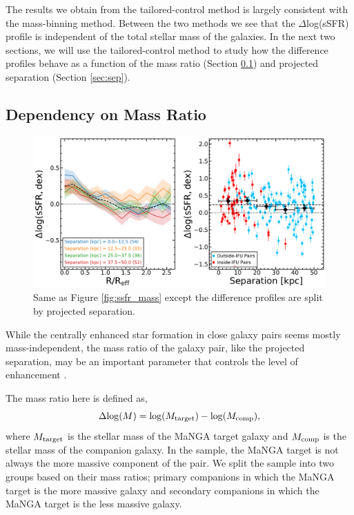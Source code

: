 \documentclass[iop,revtex4,twocolumn,apj,numberedappendix,appendixfloats]{emulateapj}
\begin{document}
The results we obtain from the tailored-control method is largely consistent with the mass-binning method. Between the two methods we see that the $\Delta$log(sSFR) profile is independent of the total stellar mass of the galaxies. In the next two sections, we will use the tailored-control method to study how the difference profiles behave as a function of the mass ratio (Section \ref{sec:dm}) and projected separation (Section \ref{sec:sep}).

\subsection{Dependency on Mass Ratio}\label{sec:dm}

\begin{figure}
\centering
\includegraphics[width=0.8\linewidth]{fig/ssfr_sep.pdf}
\caption[]{Same as Figure \ref{fig:ssfr_mass} except the difference profiles are split by projected separation. }
\label{fig:ssfr_sep}
\end{figure}

While the centrally enhanced star formation in close galaxy pairs seems mostly mass-independent, the mass ratio of the galaxy pair, like the projected separation, may be an important parameter that controls the level of enhancement \citep{Ellison:2008}. 

The mass ratio here is defined as, 
\begin{equation}
\Delta {\rm log}(M) = {\rm log}(M_{\rm target}) - {\rm log}(M_{\rm comp}),
\end{equation}
where $M_{\rm target}$ is the stellar mass of the MaNGA target galaxy and $M_{\rm comp}$ is the stellar mass of the companion galaxy. In the sample, the MaNGA target is not always the more massive component of the pair. We split the sample into two groups based on their mass ratios; primary companions in which the MaNGA target is the more massive galaxy and secondary companions in which the MaNGA target is the less massive galaxy.
\end{document}

